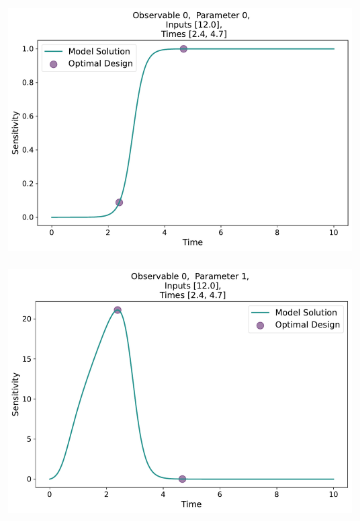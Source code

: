 \documentclass[10pt,A4paper]{article}
\begin{document}
\begin{figure}[H]\ContinuedFloat
    \begin{subfigure}{.9\textwidth}
        \centering
        \includegraphics[scale=0.35]{Figures/Sensitivity_Results_baranyi_roberts_ode_fisher_determinant_rel_sensit_cont_2times_2temps_001_x_00_p_00.pdf}
      \end{subfigure}
      \begin{subfigure}{.9\textwidth}
        \centering
        \includegraphics[scale=0.35]{Figures/Sensitivity_Results_baranyi_roberts_ode_fisher_determinant_rel_sensit_cont_2times_2temps_001_x_00_p_01.pdf}
      \end{subfigure}
  

\end{figure}
\end{document}
